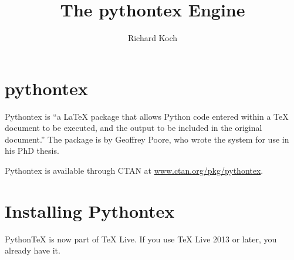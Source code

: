 \documentclass[11pt, oneside]{amsart}
\title{The pythontex Engine}
\author{Richard Koch}
\begin{document}
\maketitle
\vspace{-.3in}
\section{pythontex}
Pythontex is ``a LaTeX package that allows Python code entered within a TeX document to be
executed, and the output to be included in the original document.'' The package is by
Geoffrey Poore, who wrote the system for use in his PhD thesis.

Pythontex is available through CTAN at \href{http://www.ctan.org/pkg/pythontex}{www.ctan.org/pkg/pythontex}. 

\section{Installing Pythontex}

PythonTeX is now part of TeX Live. If you use TeX Live 2013 or later, you already have it.
\end{document}
